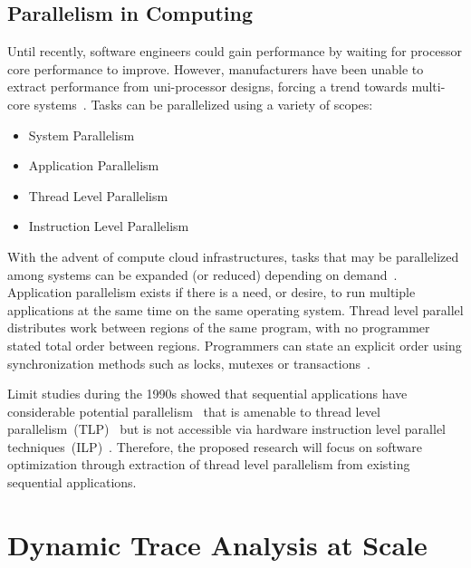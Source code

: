 \documentclass[defaultstyle,11pt]{thesis}
\begin{document}
\section{Parallelism in Computing}
\label{sec:parallelism}

Until recently, software engineers could gain performance by waiting
for processor core performance to improve.  However, manufacturers
have been unable to extract performance from uni-processor designs,
forcing a trend towards multi-core systems~\cite{sutter:05:ddj}.
Tasks can be parallelized using a variety of scopes:

\begin{itemize}
\item System Parallelism
\item Application Parallelism
\item Thread Level Parallelism
\item Instruction Level Parallelism
\end{itemize}

With the advent of compute cloud infrastructures, tasks that may be
parallelized among systems can be expanded (or reduced) depending on
demand~\cite{nurmi:09:ccgrid}.  Application parallelism exists if
there is a need, or desire, to run multiple applications at the same
time on the same operating system.  Thread level parallel distributes
work between regions of the same program, with no programmer stated
total order between regions.  Programmers can state an explicit order
using synchronization methods such as locks, mutexes or
transactions~\cite{larus:tmbook:mcp:2006, gottschlich:10:cgo}.

Limit studies during the 1990s showed that sequential applications
have considerable potential parallelism~\cite{lam:92:isca,
  wall:93:decwrl, austin:92:isca, postiff:98:um} that is amenable to
thread level parallelism~(TLP)~\cite{iyer:05:epic} but is not
accessible via hardware instruction level parallel
techniques~(ILP)~\cite{wall:93:decwrl}. Therefore, the proposed
research will focus on software optimization through extraction of
thread level parallelism from existing sequential applications.



\chapter{Dynamic Trace Analysis at Scale}
\label{chap:scale}
\end{document}
